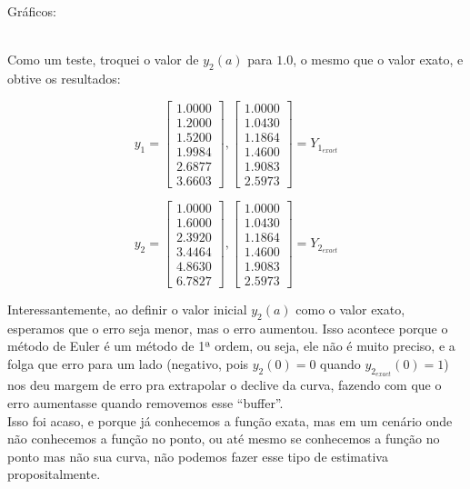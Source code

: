 Gráficos:

 \\


Como um teste, troquei o valor de $y_{2}(a)$ para $1.0$, o mesmo que o valor exato, e obtive os resultados:

$$
y_1 = \begin{bmatrix}
    1.0000 \\
    1.2000 \\
    1.5200 \\
    1.9984 \\
    2.6877 \\
    3.6603
\end{bmatrix}, \begin{bmatrix}
    1.0000 \\
    1.0430 \\
    1.1864 \\
    1.4600 \\
    1.9083 \\
    2.5973
\end{bmatrix} = Y_{1_{exact}} 
$$

$$
y_2 = \begin{bmatrix}
    1.0000 \\
    1.6000 \\
    2.3920 \\
    3.4464 \\
    4.8630 \\
    6.7827
\end{bmatrix},\begin{bmatrix}
    1.0000 \\
    1.0430 \\
    1.1864 \\
    1.4600 \\
    1.9083 \\
    2.5973
\end{bmatrix} = Y_{2_{exact}}
$$

Interessantemente, ao definir o valor inicial $y_2(a)$ como o valor exato, esperamos que o erro seja menor, mas o erro aumentou. Isso acontece porque o método de Euler é um método de 1ª ordem, ou seja, ele não é muito preciso, e a folga que erro para um lado (negativo, pois $y_2(0) = 0$ quando $y_{2_{exact}}(0) = 1$) nos deu margem de erro pra extrapolar o declive da curva, fazendo com que o erro aumentasse quando removemos esse ``buffer''. \\
Isso foi acaso, e porque já conhecemos a função exata, mas em um cenário onde não conhecemos a função no ponto, ou até mesmo se conhecemos a função no ponto mas não sua curva, não podemos fazer esse tipo de estimativa propositalmente.

